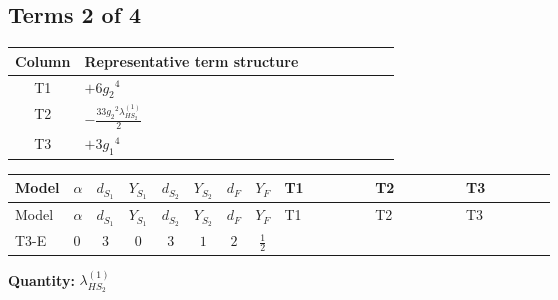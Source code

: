 \documentclass[8pt]{article}
\begin{document}
\begin{landscape}
\subsection*{Terms 2 of 4}
\begin{center}
\begin{tabular}{@{}c >{\raggedright\arraybackslash}p{0.82\linewidth}@{}}
\toprule
Column & Representative term structure \\
\midrule
T1 & \(\displaystyle +6 {g_2}^4\) \\
\midrule
T2 & \(\displaystyle -\frac{33 {g_2}^2 {\lambda_{HS_2}^{(1)}}}{2}\) \\
\midrule
T3 & \(\displaystyle +3 {g_1}^4\) \\
\midrule
\bottomrule
\end{tabular}
\end{center}
\smallskip
\tiny
\begin{longtable}{@{}llcccccc >{\raggedright\arraybackslash}p{0.21\linewidth} >{\raggedright\arraybackslash}p{0.21\linewidth} >{\raggedright\arraybackslash}p{0.21\linewidth}@{}}
\toprule
Model & $\alpha$ & $d_{S_1}$ & $Y_{S_1}$ & $d_{S_2}$ & $Y_{S_2}$ & $d_F$ & $Y_F$ & T1 & T2 & T3 \\
\midrule
\endfirsthead
\toprule
Model & $\alpha$ & $d_{S_1}$ & $Y_{S_1}$ & $d_{S_2}$ & $Y_{S_2}$ & $d_F$ & $Y_F$ & T1 & T2 & T3 \\
\midrule
\endhead
T3-E & $0$ & $3$ & $0$ & $3$ & $1$ & $2$ & $\frac{1}{2}$ & \scriptsize\adjustbox{max width=\linewidth}{$\begin{gathered} +6 {g_2}^4\end{gathered}$} & \scriptsize\adjustbox{max width=\linewidth}{$\begin{gathered} -\frac{33 {g_2}^2 {\lambda_{HS_2}^{(1)}}}{2}\end{gathered}$} & \scriptsize\adjustbox{max width=\linewidth}{$\begin{gathered} +3 {g_1}^4\end{gathered}$} \\
\midrule
\bottomrule
\end{longtable}
\clearpage
\noindent\textbf{Quantity: }$\lambda_{HS_2}^{(1)}$\par\smallskip

\end{landscape}
\end{document}
